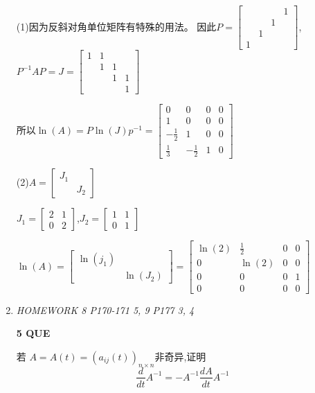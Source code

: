 \documentclass[11pt,letterpaper]{ctexart}
\begin{document}
\begin{enumerate}
(1)因为反斜对角单位矩阵有特殊的用法。 因此$P = \begin{bmatrix}
	 & & & 1 \\
	 & & 1 & \\
	 & 1 & & \\
	1 & & &
\end{bmatrix}$,
$P^{-1}AP = J = \begin{bmatrix}
	1 & 1 & & \\
	& 1 & 1 & \\
	& & 1 & 1 \\
	& & & 1 
\end{bmatrix}$

所以$\ln(A) = P \ln(J) p^{-1} = \begin{bmatrix}
	0 & 0 & 0 & 0 \\
	1 & 0 & 0 & 0 \\
	-\frac{1}{2} & 1 & 0 & 0 \\
	\frac{1}{3} & -\frac{1}{2} & 1 & 0
\end{bmatrix}$


(2)$A = \begin{bmatrix}
	J_1 & \\
	& J_2 
\end{bmatrix}$

$J_1 = \begin{bmatrix}
	2 & 1\\
	0 & 2 
\end{bmatrix}$,$J_2 = \begin{bmatrix}
	1 & 1\\
	0 & 1 
\end{bmatrix}$

$\ln(A) = \begin{bmatrix}
	\ln(j_1) & \\
	& \ln(J_2)
\end{bmatrix} = \begin{bmatrix}
	\ln(2) & \frac{1}{2} & 0 & 0 \\
	0 & \ln(2) & 0 & 0 \\
	0 & 0 & 0 & 1 \\
	0 & 0 & 0 & 0
\end{bmatrix}$



\item \textit{HOMEWORK 8 {P170-171 5, 9 P177 3, 4}}%

\textbf{5 QUE}
\bigskip

若 $A = A(t) = (a_{ij}(t))_{n \times n}$非奇异,证明 \[
	\frac{d}{dt}A^{-1} = -A^{-1}\frac{dA}{dt}A^{-1}
\]


\end{enumerate}
\end{document}
